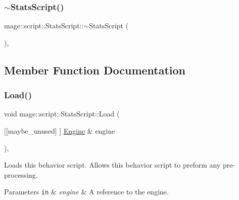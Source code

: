 \hypertarget{classmage_1_1script_1_1_stats_script_a5b9b30aa6939968c2aee8cdf11f6486c}{}\label{classmage_1_1script_1_1_stats_script_a5b9b30aa6939968c2aee8cdf11f6486c} 
\subsubsection{\texorpdfstring{$\sim$\+Stats\+Script()}{~StatsScript()}}
{\footnotesize\ttfamily mage\+::script\+::\+Stats\+Script\+::$\sim$\+Stats\+Script (\begin{DoxyParamCaption}{ }\end{DoxyParamCaption})\hspace{0.3cm}{\ttfamily [virtual]}, {\ttfamily [default]}}



\subsection{Member Function Documentation}
\hypertarget{classmage_1_1script_1_1_stats_script_a4bfada754da5ca76591c5e7b9b0b1f51}{}\label{classmage_1_1script_1_1_stats_script_a4bfada754da5ca76591c5e7b9b0b1f51} 
\subsubsection{\texorpdfstring{Load()}{Load()}}
{\footnotesize\ttfamily void mage\+::script\+::\+Stats\+Script\+::\+Load (\begin{DoxyParamCaption}\item[{\mbox{[}\mbox{[}maybe\+\_\+unused\mbox{]} \mbox{]} \hyperlink{classmage_1_1_engine}{Engine} \&}]{engine }\end{DoxyParamCaption})\hspace{0.3cm}{\ttfamily [override]}, {\ttfamily [virtual]}}

Loads this behavior script. Allows this behavior script to preform any pre-\/processing.


\begin{DoxyParams}[1]{Parameters}
\mbox{\tt in}  & {\em engine} & A reference to the engine. \\
\hline
\end{DoxyParams}

